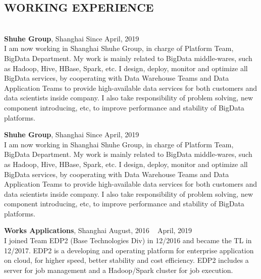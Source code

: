 \documentclass{res}
\begin{document}
\thispagestyle{empty} %

\address{{\bf Address:} 466 Tianbao Road, Shanghai, 200086 \hspace{0.25in}  {\bf Tel:} 18017661124 \hspace{0.25in}  {\bf   Email:} dd.famous@gmail.com}

\begin{resume}
\section{{WORKING EXPERIENCE}}
\vspace{-10pt}
\hrulefill\\

{\bf Shuhe Group}, Shanghai \hfill Since April, 2019 \\
I am now working in Shanghai Shuhe Group, in charge of Platform Team, BigData Department. 
My work is mainly related to BigData middle-wares, such as Hadoop, Hive, HBase, Spark, etc. I design, deploy, monitor and optimize all BigData services, by cooperating with Data Warehouse Teams and Data Application Teams to provide high-available data services for both customers and data scientists inside company. I also take responsibility of problem solving, new component introducing, etc, to improve performance and stability of BigData platforms.

{\bf Shuhe Group}, Shanghai \hfill Since April, 2019 \\
I am now working in Shanghai Shuhe Group, in charge of Platform Team, BigData Department. 
My work is mainly related to BigData middle-wares, such as Hadoop, Hive, HBase, Spark, etc. I design, deploy, monitor and optimize all BigData services, by cooperating with Data Warehouse Teams and Data Application Teams to provide high-available data services for both customers and data scientists inside company. I also take responsibility of problem solving, new component introducing, etc, to improve performance and stability of BigData platforms.

\vspace{-5pt}
{\bf Works Applications}, Shanghai \hfill August, 2016 ~ April, 2019\\
I joined Team EDP2 (Base Technologies Div) in 12/2016 and became the TL in 12/2017. 
EDP2 is a developing and operating platform for enterprise application on cloud, for higher speed, better stability and cost efficiency.
EDP2 includes a server for job management and a Hadoop/Spark cluster for job execution. 


\end{resume}
\end{document}
